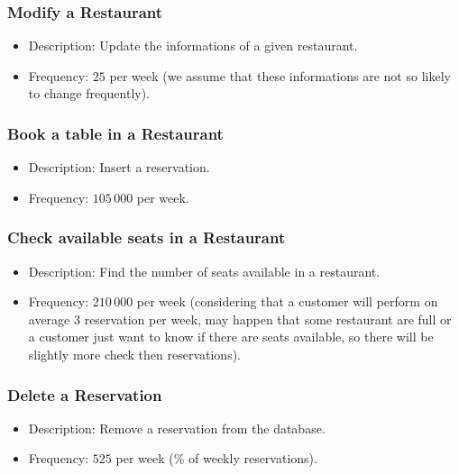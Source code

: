 \subsubsection{Modify a Restaurant}

\begin{itemize}
	\item Description: Update the informations of a given restaurant.
	\item Frequency: \(25\) per week (we assume that these informations are
		not so likely to change frequently).
\end{itemize}

\subsubsection{Book a table in a Restaurant}

\begin{itemize}
	\item Description: Insert a reservation.
	\item Frequency: \(105\,000\) per week.
\end{itemize}


\subsubsection{Check available seats in a Restaurant}

\begin{itemize}
	\item Description: Find the number of seats available in a restaurant.
	\item Frequency: \(210\,000\) per week (considering that a customer will perform on average 3 reservation per week, may happen that some restaurant are full or a customer just want to know if there are seats available, so there will be slightly more check then reservations).
\end{itemize}

\subsubsection{Delete a Reservation}

\begin{itemize}
	\item Description: Remove a reservation from the database.
	\item Frequency: \(525\) per week (\% of weekly reservations).
\end{itemize}

